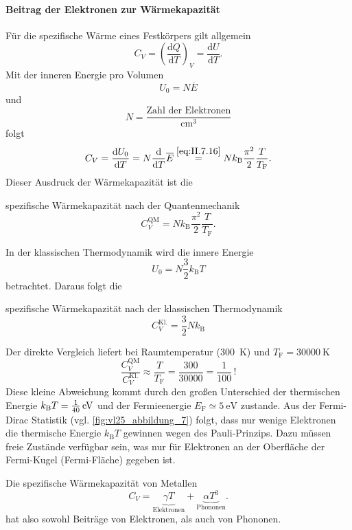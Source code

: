 \setcounter{section}{7}
\setcounter{subsection}{0}

\paragraph{Beitrag der Elektronen zur Wärmekapazität}
	Für die spezifische Wärme eines Festkörpers gilt allgemein
	$$
		C_{V} = \left( \frac{\mathrm{d}Q}{\mathrm{d}T} \right)_ V = \frac{\mathrm{d}U}{\mathrm{d}T}.
	$$ 
	Mit der inneren Energie pro Volumen
	$$
		U_0 = N \overline{E}
	$$ 
	und
	$$
		N=\frac{\text{Zahl der Elektronen}}{\unit{\centi\meter\cubed}}
	$$
	folgt
	\begin{equation}
		\label{eq:II.7.17}
		C_{V} = \frac{\mathrm{d}U_0}{\mathrm{d}T} = N \frac{\mathrm{d}}{\mathrm{d}T} \overline{E} \overset{\eqref{eq:II.7.16}}{=} N k_{\mathrm{B}} \frac{\pi^2}{2} \frac{T}{T_{\mathrm{F}}}.
	\end{equation}
	Dieser Ausdruck der Wärmekapazität ist die 
	\begin{important}
		spezifische Wärmekapazität nach der Quantenmechanik
		$$
			C_V^\mathrm{QM}=Nk_\mathrm{B}\frac{\pi^2}{2}\frac{T}{T_\mathrm{F}}.
		$$
	\end{important}
	In der klassischen Thermodynamik wird die innere Energie
	$$
	U_0 = N \frac{3}{2} k_{\mathrm{B}}T
	$$ 
	betrachtet. Daraus folgt die
	\begin{important}
		spezifische Wärmekapazität nach der klassischen Thermodynamik
		$$
			C_{V}^{\text{Kl.}} = \frac{3}{2} N k_{\mathrm{B}}
		$$
	\end{important}
	Der direkte Vergleich liefert bei Raumtemperatur (\SI{300}{K}) und $T_\mathrm F=\SI{30000}{\kelvin}$
	$$
	\frac{C_{V}^{\text{QM}}}{C_{V}^{\text{Kl.}}} \approx \frac{T}{T_{\mathrm{F}}} = \frac{\num{300}}{\num{30000}} = \frac{1}{100}\,!
	$$ 
	Diese kleine Abweichung kommt durch den großen Unterschied der thermischen Energie $k_\mathrm{B}T=\SI[parse-numbers=false]{\frac{1}{40}}{\electronvolt}$ und der Fermieenergie $E_\mathrm F \simeq \SI{5}{\electronvolt}$ zustande.
	Aus der Fermi-Dirac Statistik (vgl. \autoref{fig:vl25_abbildung_7}) folgt, dass nur wenige Elektronen die thermische Energie $k_{\mathrm{B}}T$ gewinnen wegen des Pauli-Prinzips. 
	Dazu müssen freie Zustände verfügbar sein, was nur für Elektronen an der Oberfläche der Fermi-Kugel (Fermi-Fläche) gegeben ist.

	Die spezifische Wärmekapazität von Metallen
	\begin{equation}
		\label{eq:II.7.20}
		C_{V} = \underbrace{\gamma T}_{\mathrm{Elektronen}} + \underbrace{\alpha T^3}_{\text{Phononen}}.
	\end{equation}
	hat also sowohl Beiträge von Elektronen, als auch von Phononen.


